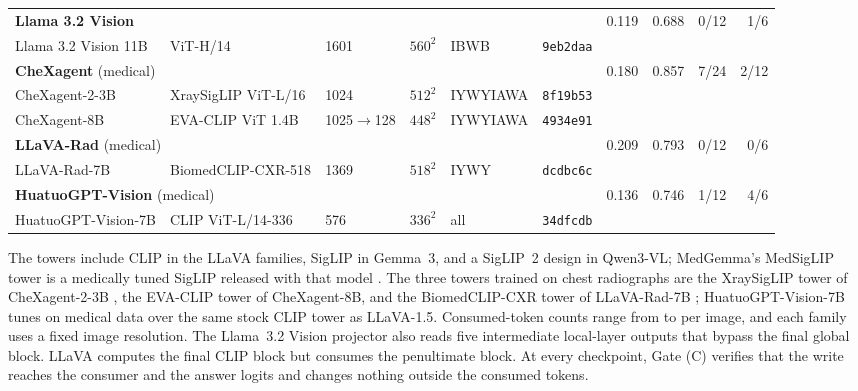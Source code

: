 \documentclass{article}
\providecommand{\DIFdelend}{} %
\DeclareRobustCommand{\DIFdelend}{\DIFOaddend \let\includegraphics\DIFOincludegraphics} %
\begin{document}
\begin{table}[htbp]
{{{\begin{tabular}{llllll@{\hspace{8pt}}rrrr}
\midrule
\multicolumn{6}{l}{\textbf{Llama 3.2 Vision}~\citep{meta2024llama32vision}} & 0.119 & 0.688 & \cellcolor{cfTerra1}0/12 & \cellcolor{cfTerra2}1/6 \\
\quad Llama 3.2 Vision 11B & ViT-H/14 & 1601 & $560^2$ & IBWB & \texttt{9eb2daa} & & & & \\
\midrule
\multicolumn{6}{l}{\textbf{CheXagent} (medical)~\citep{chen2024chexagent}} & 0.180 & 0.857 & \cellcolor{cfTerra3}7/24 & \cellcolor{cfTerra2}2/12 \\
\quad CheXagent-2-3B & XraySigLIP ViT-L/16 & 1024 & $512^2$ & IYWYIAWA & \texttt{8f19b53} & & & & \\
\quad CheXagent-8B & EVA-CLIP ViT 1.4B & 1025$\to$128 & $448^2$ & IYWYIAWA & \texttt{4934e91} & & & & \\
\midrule
\multicolumn{6}{l}{\textbf{LLaVA-Rad} (medical)~\citep{zambranochaves2025llavarad}} & 0.209 & 0.793 & \cellcolor{cfTerra1}0/12 & \cellcolor{cfTerra1}0/6 \\
\quad LLaVA-Rad-7B & BiomedCLIP-CXR-518 & 1369 & $518^2$ & IYWY & \texttt{dcdbc6c} & & & & \\
\midrule
\multicolumn{6}{l}{\textbf{HuatuoGPT-Vision} (medical)~\citep{chen2024huatuogptvision}} & 0.136 & 0.746 & \cellcolor{cfTerra2}1/12 & \cellcolor{cfTerra3}4/6 \\
\quad HuatuoGPT-Vision-7B & CLIP ViT-L/14-336 & 576 & $336^2$ & all & \texttt{34dfcdb} & & & & \\
\bottomrule
\end{tabular}}}
}
\end{table}

\DIFdelend The towers include CLIP \citep{radford2021clip} in the LLaVA families, SigLIP \citep{zhai2023siglip} in Gemma~3, and a SigLIP~2 design \citep{tschannen2025siglip2} in Qwen3-VL; MedGemma's MedSigLIP tower is a medically tuned SigLIP released with that model \citep{sellergren2025medgemma}. The three towers trained on chest radiographs are the XraySigLIP tower of CheXagent-2-3B \citep{chen2024chexagent}, the EVA-CLIP tower \citep{sun2023evaclip} of CheXagent-8B, and the BiomedCLIP-CXR tower of LLaVA-Rad-7B \citep{zhang2025biomedclip,zambranochaves2025llavarad}; HuatuoGPT-Vision-7B tunes on medical data over the same stock CLIP tower as LLaVA-1.5. Consumed-token counts range from \cfTokensMin{} to \cfTokensMax{} per image, and each family uses a fixed image resolution. The Llama~3.2 Vision projector also reads five intermediate local-layer outputs that bypass the final global block. LLaVA computes the final CLIP block but consumes the penultimate block. At every checkpoint, Gate (C) verifies that the write reaches the consumer and the answer logits and changes nothing outside the consumed tokens.
\end{document}
